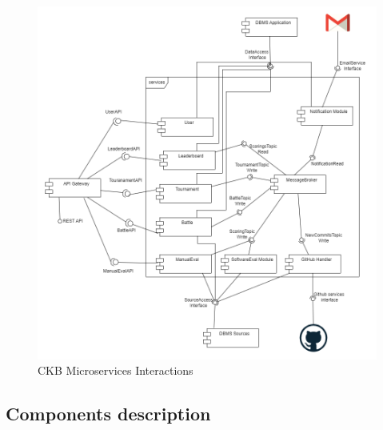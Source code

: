 \begin{figure}[H]
    \centering
    \includegraphics[width=1\linewidth]{misc//Images/microservicesComponentDiagram.png}
    \caption{\ac{CKB} Microservices Interactions}
    \label{fig:enter-label}
\end{figure}

\subsection{Components description}

